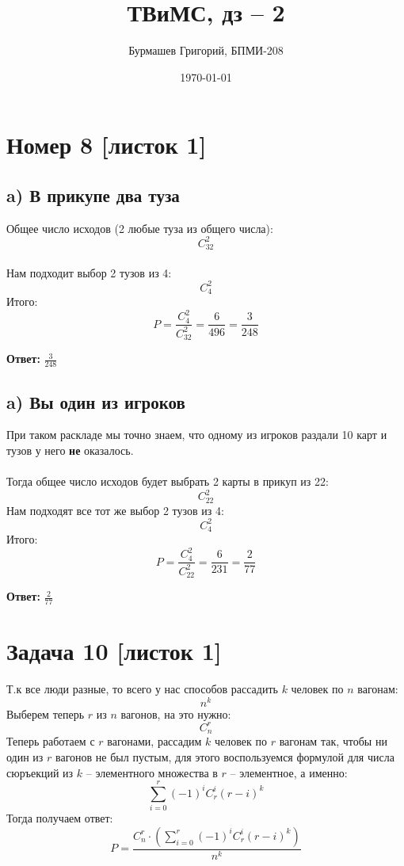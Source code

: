 \documentclass[a4paper,12pt]{article}
\author{Бурмашев Григорий, БПМИ-208}
\title{ТВиМС, дз -- 2}
\date{\today}
\begin{document}
\maketitle
\section*{Номер 8 [листок 1]}
\subsection*{a) В прикупе два туза}
Общее число исходов (2 любые туза из общего числа):
\[
C^2_{32}
\]
\\
Нам подходит выбор 2 тузов из 4:
\[
C^2_4
\]
Итого:
\[
P = \frac{C^2_4}{C^2_{32}} = \frac{6}{496} = \frac{3}{248}
\]
\begin{center}
\textbf{Ответ: } $\frac{3}{248}$
\end{center}
\subsection*{a) Вы один из игроков}
При таком раскладе мы точно знаем, что одному из игроков раздали 10 карт и тузов у него \textbf{не} оказалось. 
\\\\
Тогда общее число исходов будет выбрать 2 карты в прикуп из 22: 
\[
C^2_{22}
\]
Нам подходят все тот же выбор 2 тузов из 4:
\[
C^2_4
\]
Итого:
\[
P = \frac{C^2_4}{C^2_{22}} = \frac{6}{231} = \frac{2}{77}
\]
\begin{center}
\textbf{Ответ: } $\frac{2}{77}$
\end{center}
\clearpage
\section*{Задача 10 [листок 1]}
Т.к все люди разные, то всего у нас способов рассадить $k$ человек по $n$ вагонам:
\[
n^k
\]
Выберем теперь $r$ из $n$ вагонов, на это нужно:
\[
C^r_n
\]
Теперь работаем с $r$ вагонами, рассадим $k$ человек по $r$ вагонам так, чтобы ни один из $r$ вагонов не был пустым, для этого воспользуемся формулой для числа сюръекций из $k$ -- элементного множества в $r$ -- элементное, а именно:
\[
\sum_{i = 0}^{r} (-1)^i C^i_r (r - i)^k
\]
Тогда получаем ответ:
\[
P = \frac{C_n^r \cdot \left(\sum\limits_{i = 0}^{r} (-1)^i C^i_r (r - i)^k\right)}{n^k}
\]
\clearpage
\end{document}
